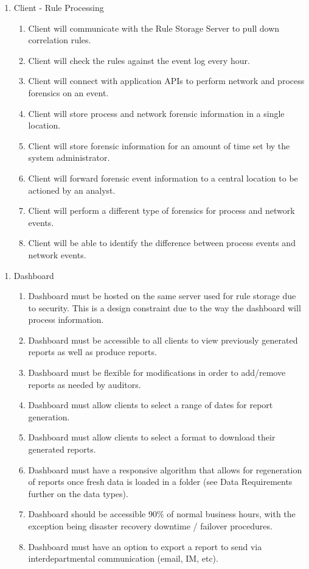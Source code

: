 \documentclass{scrreprt}
\begin{document}
\begin{enumerate}[label*=R\arabic*.]
    \item Client - Rule Processing
    \begin{enumerate}[label*=\arabic*.]
         \item Client will communicate with the Rule Storage Server to pull down correlation rules.
	\item Client will check the rules against the event log every hour.
\item Client will connect with application APIs to perform network and process forensics on an event.
\item Client will store process and network forensic information in a single location.
\item Client will store forensic information for an amount of time set by the system administrator.
\item Client will forward forensic event information to a central location to be actioned by an analyst.
\item Client will perform a different type of forensics for process and network events.
\item Client will be able to identify the difference between process events and network events.

    \end{enumerate}
\end{enumerate}

\begin{enumerate}[label*=R\arabic*.]
    \item Dashboard
    \begin{enumerate}[label*=\arabic*.]
        \item Dashboard must be hosted on the same server used for rule storage due to security. This is a design constraint due to the way the dashboard will process information.
	\item Dashboard must be accessible to all clients to view previously generated reports as well as produce reports.
\item Dashboard must be flexible for modifications in order to add/remove reports as needed by auditors.
\item Dashboard must allow clients to select a range of dates for report generation.
\item Dashboard must allow clients to select a format to download their generated reports.
\item Dashboard must have a responsive algorithm that allows for regeneration of reports once fresh data is loaded in a folder (see Data Requirements further on the data types).
\item Dashboard should be accessible 90\% of normal business hours, with the exception being disaster recovery downtime / failover procedures.
\item Dashboard must have an option to export a report to send via interdepartmental communication (email, IM, etc).
    \end{enumerate}
\end{enumerate}
\end{document}
